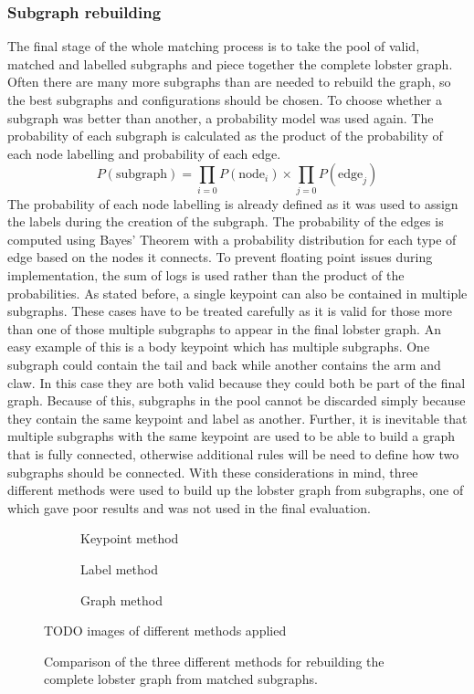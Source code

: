 \subsubsection{Subgraph rebuilding}\label{sec:graph-creation}
The final stage of the whole matching process is to take the pool of valid, matched and labelled subgraphs and piece together the complete lobster graph. Often there are many more subgraphs than are needed to rebuild the graph, so the best subgraphs and configurations should be chosen. To choose whether a subgraph was better than another, a probability model was used again. The probability of each subgraph is calculated as the product of the probability of each node labelling and probability of each edge. 
\begin{equation}
P(\text{subgraph}) = \prod_{i=0} P(\text{node}_{i}) \times \prod_{j=0} P(\text{edge}_{j})
\end{equation}
The probability of each node labelling is already defined as it was used to assign the labels during the creation of the subgraph. The probability of the edges is computed using Bayes' Theorem with a probability distribution for each type of edge based on the nodes it connects. To prevent floating point issues during implementation, the sum of logs is used rather than the product of the probabilities. 
\n
As stated before, a single keypoint can also be contained in multiple subgraphs. These cases have to be treated carefully as it is valid for those more than one of those multiple subgraphs to appear in the final lobster graph. An easy example of this is a body keypoint which has multiple subgraphs. One subgraph could contain the tail and back while another contains the arm and claw. In this case they are both valid because they could both be part of the final graph. Because of this, subgraphs in the pool cannot be discarded simply because they contain the same keypoint and label as another. Further, it is inevitable that multiple subgraphs with the same keypoint are used to be able to build a graph that is fully connected, otherwise additional rules will be need to define how two subgraphs should be connected.
\n
With these considerations in mind, three different methods were used to build up the lobster graph from subgraphs, one of which gave poor results and was not used in the final evaluation. 
\begin{figure}[H]
\centering
	\begin{subfigure}{0.31\textwidth}
	
	\caption{Keypoint method}	
	\end{subfigure}
	\hspace*{\fill}
	\begin{subfigure}{0.31\textwidth}
	
	\caption{Label method}
	\end{subfigure}
	\hspace*{\fill}
	\begin{subfigure}{0.31\textwidth}
	
	\caption{Graph method}
	\end{subfigure}
TODO images of different methods applied
\caption{Comparison of the three different methods for rebuilding the complete lobster graph from matched subgraphs.}
\end{figure}
